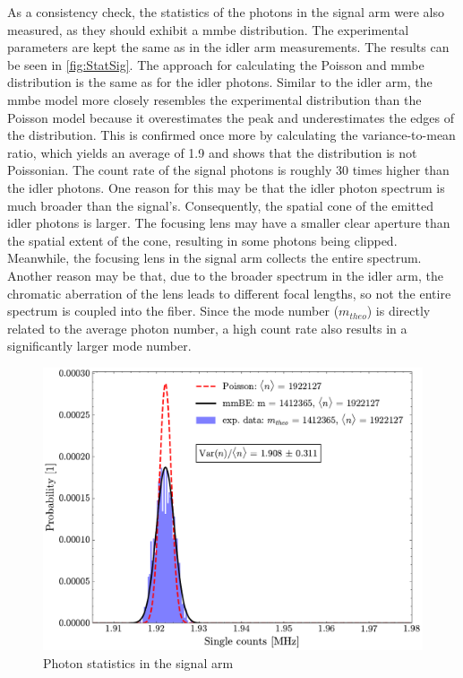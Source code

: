 As a consistency check, the statistics of the photons in the signal arm were also measured, as they should exhibit a \acrshort{mmbe} distribution. The experimental parameters are kept the same as in the idler arm measurements. \newline
The results can be seen in \autoref{fig:StatSig}. The approach for calculating the Poisson and \acrshort{mmbe} distribution is the same as for the idler photons. Similar to the idler arm, the \acrshort{mmbe} model more closely resembles the experimental distribution than the Poisson model because it overestimates the peak and underestimates the edges of the distribution. This is confirmed once more by calculating the variance-to-mean ratio, which yields an average of 1.9 and shows that the distribution is not Poissonian. \newline
The count rate of the signal photons is roughly 30 times higher than the idler photons. One reason for this may be that the idler photon spectrum is much broader than the signal's. Consequently, the spatial cone of the emitted idler photons is larger. The focusing lens may have a smaller clear aperture than the spatial extent of the cone, resulting in some photons being clipped. Meanwhile, the focusing lens in the signal arm collects the entire spectrum. Another reason may be that, due to the broader spectrum in the idler arm, the chromatic aberration of the lens leads to different focal lengths, so not the entire spectrum is coupled into the fiber. \newline
Since the mode number ($m_{theo}$) is directly related to the average photon number, a high count rate also results in a significantly larger mode number.
\begin{figure}[tb!]
	\centering
	\includegraphics[width=.7\textwidth]{Images/SingleStatisticsSignal.pdf}
	\caption{Photon statistics in the signal arm}
	\label{fig:StatSig}
\end{figure}

